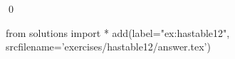 
\begin{ex} 
  \label{ex:hastable12}
  
  \qed
\end{ex} 
\begin{python0}
from solutions import *
add(label="ex:hastable12",
    srcfilename='exercises/hastable12/answer.tex') 
\end{python0}
